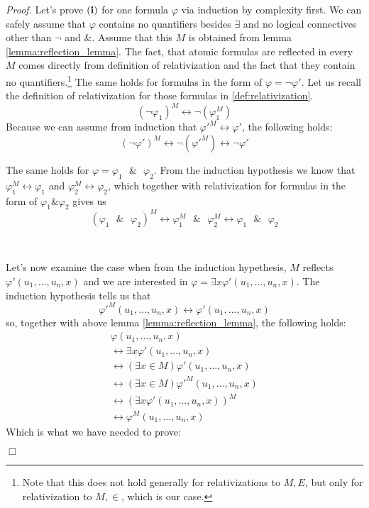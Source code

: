 \documentclass[12pt,a4paper]{article}
\newenvironment{proof}
{\noindent \textit{Proof.}}
{\hspace*{\fill} $\Box$}
\renewcommand{\iff}{\leftrightarrow}
\begin{document}
\begin{proof}
Let's prove $\bold{(i)}$ for one formula $\varphi$ via induction by complexity first. We can safely assume that $\varphi$ contains no quantifiers besides $\exists$ and no logical connectives other than $\neg$ and $\&$.
Assume that this $M$ is obtained from lemma \ref{lemma:reflection_lemma}. The fact, that atomic formulas are reflected in every $M$ comes directly from definition of relativization and the fact that they contain no quantifiers.\footnote{Note that this does not hold generally for relativizations to $M, E$, but only for relativization to $M, \in$, which is our case.}
The same holds for formulas in the form of $\varphi = \neg \varphi'$. Let us recall the definition of relativization for those formulas in \ref{def:relativization}.
\begin{equation}
(\neg \varphi_1)^M \iff \neg (\varphi_1^M)
\end{equation}
Because we can assume from induction that $\varphi'^M \iff \varphi'$, the following holds:
\begin{equation}
(\neg \varphi')^M \iff \neg (\varphi'^M) \iff \neg \varphi'
\end{equation}

The same holds for $\varphi = \varphi_1\mbox{ }\&\mbox{ }\varphi_2$. From the induction hypothesis we know that $\varphi_1^M \iff \varphi_1$ and $\varphi_2^M \iff \varphi_2$, which together with relativization for formulas in the form of $\varphi_1 \& \varphi_2$ gives us
\begin{equation}
(\varphi_1\mbox{ }\&\mbox{ }\varphi_2)^M \iff \varphi_1^M\mbox{ }\&\mbox{ }\varphi_2^M \iff \varphi_1\mbox{ }\&\mbox{ }\varphi_2
\end{equation}

\

Let's now examine the case when from the induction hypethesis, $M$ reflects $\varphi'(u_1, \ldots, u_n, x)$ and we are interested in $\varphi = \exists x \varphi'(u_1, \ldots, u_n, x)$.
The induction hypothesis tells us that 
\begin{equation}
\varphi'^M(u_1, \ldots, u_n, x) \iff \varphi'(u_1, \ldots, u_n, x)
\end{equation}
so, together with above lemma \ref{lemma:reflection_lemma}, the following holds:
\begin{equation}
\begin{gathered}
\varphi(u_1, \ldots, u_n, x) \\
\iff \exists x \varphi'(u_1, \ldots, u_n, x) \\
\iff (\exists x \in M) \varphi'(u_1, \ldots, u_n, x) \\
\iff (\exists x \in M) \varphi'^M (u_1, \ldots, u_n, x) \\
\iff (\exists x \varphi'(u_1, \ldots, u_n, x))^M \\
\iff \varphi^M(u_1, \ldots, u_n, x)
\end{gathered}
\end{equation}
Which is what we have needed to prove:


\end{proof}
\end{document}
